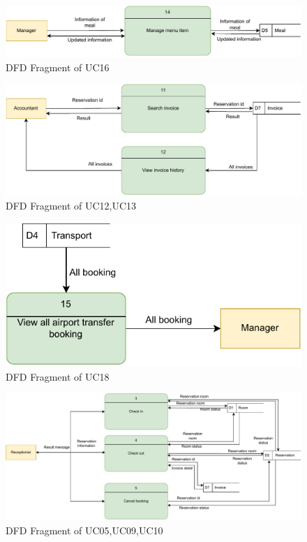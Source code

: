 \begin{figure}[H]
    \includegraphics[width=1\linewidth]{img/dfd5.pdf}
    \caption{DFD Fragment of UC16}
    \label{fig:DFD Fragment of UC16}
\end{figure}
\begin{figure}[H]
    \includegraphics[width=1\linewidth]{img/dfd6.pdf}
    \caption{DFD Fragment of UC12,UC13}
    \label{fig:DFD Fragment of UC12,UC13}
\end{figure}
\begin{figure}[H]
    \includegraphics[width=1\linewidth]{img/dfd7.pdf}
    \caption{DFD Fragment of UC18}
    \label{fig:DFD Fragment of UC18}
\end{figure}
\begin{figure}[H]
    \includegraphics[width=1\linewidth]{img/dfd8.pdf}
    \caption{DFD Fragment of UC05,UC09,UC10}
    \label{fig:DFD Fragment of UC05,UC09,UC10}
\end{figure}
